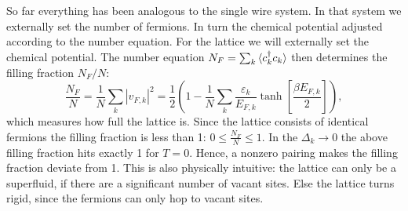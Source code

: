 So far everything has been analogous to the single wire system. In that system we externally set the number of fermions. In turn the chemical potential adjusted according to the number equation. For the lattice we will externally set the chemical potential. The number equation $N_F = \sum_k \braket{c^\dagger_k c_k}$ then determines the filling fraction $N_F / N$:
\begin{equation}
\frac{N_F}{N} = \frac{1}{N}\sum_k |v_{F,k}|^2 = \frac{1}{2}\left(1 - \frac{1}{N}\sum_k \frac{\varepsilon_k}{E_{F,k}}\tanh\left[\frac{\beta E_{F,k}}{2} \right] \right), 
\label{eq.fillingfraction.lattice}
\end{equation}
which measures how full the lattice is. Since the lattice consists of identical fermions the filling fraction is less than 1: $0 \leq \frac{N_F}{N} \leq 1$. In the $\Delta_k \to 0$ the above filling fraction hits exactly 1 for $T = 0$. Hence, a nonzero pairing makes the filling fraction deviate from 1. This is also physically intuitive: the lattice can only be a superfluid, if there are a significant number of vacant sites. Else the lattice turns rigid, since the fermions can only hop to vacant sites. 



